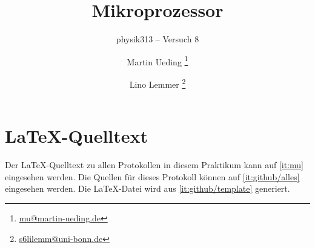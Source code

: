 


\usepackage{placeins}
\usepackage{minted}
\usepackage{multicol}


\subject{Praktikumsprotokoll}
\title{Mikroprozessor}
\subtitle{physik313 – Versuch 8}
\author{
	Martin Ueding
    \footnote{\href{mailto:mu@martin-ueding.de}{mu@martin-ueding.de}}
	\and
	Lino Lemmer
    \footnote{\href{mailto:s6lilemm@uni-bonn.de}{s6lilemm@uni-bonn.de}}
}


\newcommand\fT{f_\text{T}}
\newcommand\IB{I_\text{B}}
\newcommand\IC{I_\text{C}}
\newcommand\ID{I_\text{D}}
\newcommand\IE{I_\text{E}}
\newcommand\IS{I_\text{S}}
\newcommand\RC{R_\text{C}}
\newcommand\RD{R_\text{D}}
\newcommand\RE{R_\text{E}}
\newcommand\UBE{U_\text{BE}}
\newcommand\UB{U_\text{B}}
\newcommand\UCE{U_\text{CE}}
\newcommand\UC{U_\text{C}}
\newcommand\UD{U_\text{D}}
\newcommand\UDS{U_\text{DS}}
\newcommand\UE{U_\text{E}}
\newcommand\UGS{U_\text{GS}}
\newcommand\UG{U_\text{G}}
\newcommand\Uin{U_\text{in}}
\newcommand\Uout{U_\text{out}}

\newcommand\UEH{U_\text{E H}}
\newcommand\UEL{U_\text{E L}}
\newcommand\UH{U_\text{H}}
\newcommand\UL{U_\text{L}}
\newcommand\UQH{U_\text{Q H}}
\newcommand\UQL{U_\text{Q L}}

\newcommand\mand {\wedge}
\newcommand\mhigh{\top}
\newcommand\mlow {\bot}
\newcommand\mnand{\bar\wedge}
\newcommand\mnor {\bar\vee}
\newcommand\mnot {\neg}
\newcommand\mor  {\vee}
\newcommand\mxor {\veebar}
\newcommand\tand {\textsc{and}}
\newcommand\thigh{\textsc{high}}
\newcommand\tlow {\textsc{low}}
\newcommand\tnand{\textsc{nand}}
\newcommand\tnor {\textsc{nor}}
\newcommand\tnot {\textsc{not}}
\newcommand\tor  {\textsc{or}}
\newcommand\txor {\textsc{xor}}



\maketitle

\section*{\LaTeX-Quelltext}

Der \LaTeX-Quelltext zu allen Protokollen in diesem Praktikum kann auf
\ref{it:mu} eingesehen werden. Die Quellen für dieses Protokoll können auf
\ref{it:github/alles} eingesehen werden. Die \LaTeX-Datei wird aus
\ref{it:github/template} generiert.


